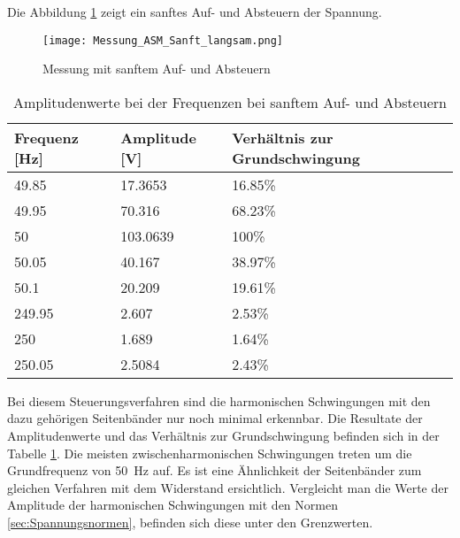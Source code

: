 Die Abbildung \ref{fig:Mess_ASM_Sanft_langsam} zeigt ein sanftes Auf- und Absteuern der Spannung.

\begin{figure}[ht!]
	\centering
	\texttt{[image: Messung\_ASM\_Sanft\_langsam.png]}	
	\caption{Messung mit sanftem Auf- und Absteuern}\label{fig:Mess_ASM_Sanft_langsam}
\end{figure}


\begin{table}[ht!]
	\centering
	\begin{tabular}{|l|l|l|}
		\hline
		Frequenz {[}Hz{]} & Amplitude {[}V{]} & Verhältnis zur Grundschwingung \\ \hline
		49.85             & 17.3653           & 16.85\%                        \\ \hline
		49.95             & 70.316            & 68.23\%                        \\ \hline
		50                & 103.0639          & 100\%                          \\ \hline
		50.05             & 40.167            & 38.97\%                        \\ \hline
		50.1              & 20.209            & 19.61\%                        \\ \hline
		249.95            & 2.607             & 2.53\%                         \\ \hline
		250               & 1.689             & 1.64\%                         \\ \hline
		250.05            & 2.5084            & 2.43\%                         \\ \hline
	\end{tabular}
\caption{Amplitudenwerte bei der Frequenzen bei sanftem Auf- und Absteuern}\label{tab:Mess_Spannung_ASM_AufAb_sanft}
\end{table}


Bei diesem Steuerungsverfahren sind die harmonischen Schwingungen mit den dazu gehörigen Seitenbänder nur noch minimal erkennbar. Die Resultate der Amplitudenwerte und das Verhältnis zur Grundschwingung befinden sich in der Tabelle \ref{tab:Mess_Spannung_ASM_AufAb_sanft}. Die meisten zwischenharmonischen Schwingungen treten um die Grundfrequenz von \SI{50}{Hz} auf. Es ist eine Ähnlichkeit der Seitenbänder zum gleichen Verfahren mit dem Widerstand ersichtlich. Vergleicht man die Werte der Amplitude der harmonischen Schwingungen mit den Normen \ref{sec:Spannungsnormen}, befinden sich diese unter den Grenzwerten.



